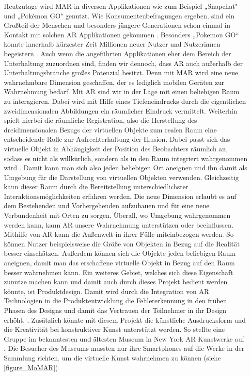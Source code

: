 \documentclass[12pt,a4paper, oneside]{scrartcl}
\begin{document}
Heutzutage wird MAR in diversen Applikationen wie zum Beispiel „Snapchat" \cite{snapchat} und „Pokémon GO" \cite{pokemon_go} genutzt. 
Wie Konsumentenbefragungen ergeben, sind ein Großteil der Menschen und besonders jüngere Generationen schon einmal in Kontakt mit solchen AR Applikationen gekommen \cite{umfrage_2016}. Besonders „Pokemon GO“ konnte innerhalb kürzester Zeit Millionen neuer Nutzer und Nutzerinnen begeistern \cite{tobien_2016}.
Auch wenn die angeführten Applikationen eher dem Bereich der Unterhaltung zuzuordnen sind, finden wir dennoch, dass AR auch außerhalb der Unterhaltungsbranche großes Potenzial besitzt. Denn mit MAR wird eine neue wahrnehmbare Dimension geschaffen, der es lediglich mobilen Geräten zur Wahrnehmung bedarf. Mit AR sind wir in der Lage mit einen beliebigen Raum zu interagieren. Dabei wird mit Hilfe eines Tiefeneindrucks durch die eigentlichen zweidimensionalen Abbildungen ein räumlicher Eindruck vermittelt. 
Weiterhin spielt hierbei die räumliche Registration, also die Herstellung des dreidimensionalen Bezugs der virtuellen Objekte zum realen Raum eine entscheidende Rolle zur Aufrechterhaltung der Illusion. Dabei passt sich das virtuelle Objekt in Abhängigkeit der Position des Beobachters räumlich an, sodass es nicht als willkürlich, sondern als in den Raum integriert wahrgenommen wird \cite{trinler_2009}.
Damit kann man sich also jeden beliebigen Ort aneignen und ihn damit als  Umgebung für die Darstellung von virtuellen Objekten verwenden. Gleichzeitig kann dieser Raum durch die Bereitstellung unterschiedlichster Interaktionsmöglichkeiten erfahren werden. 
Die neue Dimension erlaubt es auf dem Bestehenden und Vorhergehenden aufzubauen und für eine neue Verbundenheit mit Orten zu sorgen.
Überall, wo Umgebung wahrgenommen werden kann, kann AR unsere Wahrnehmung unterstützen oder beeinflussen.
Mithilfe von AR kann die Außenwelt in ihrer Fülle miteinbezogen werden.
So können Nutzer beispielsweise die Größe von Objekten in Bezug auf die Realität besser einschätzen. Außerdem können sich die Objekte jeden beliebigen Raum aneignen, damit man das erschaffene virtuelle Objekt in Bezug auf den Raum besser wahrnehmen kann. 
Ein weiteres Gebiet, welches sich diese Eigenschaft zunutze machen kann und damit auch durch dieses Projekt bedient werden könnte, ist Produktdesign. Damit wird durch die Integration von AR Technologien in die Produktentwicklung die Fehlererkennung in den frühen Phasen des Designs und damit das Vertrauen der Teilnehmer in ihr Design erhöht. \cite{mourtzis_2018}.
Zusätzlich könnte mit diesem Projekt die künstliche Ausdrucksform und die Kreativität bei konstruktiver Kunst unterstützt werden. So stellte eine Gruppe im bekanntesten und ältesten Museum in New York AR Kunstwerke auf \cite{urbanshit_2018}. Die Besucher des Museums mussten nur ihre Smartphones auf die Werke in der Sammlung richten, um die virtuelle Kunst wahrnehmen zu können (siehe \autoref{figure_MoMAR}). \\
\end{document}
